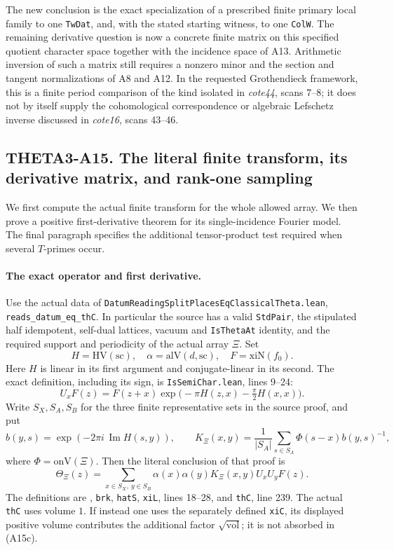 \documentclass[11pt]{article}
\theoremstyle{definition}\newtheorem{definition}[theorem]{Definition}\newtheorem{remark}[theorem]{Remark}
\begin{document}
The new conclusion is the exact specialization of a prescribed finite
primary local family to one \texttt{TwDat}, and, with the stated
starting witness, to one \texttt{ColW}.  The remaining derivative
question is now a concrete finite matrix on this specified quotient
character space together with the incidence space of A13.  Arithmetic
inversion of such a matrix still requires a nonzero minor and the
section and tangent normalizations of A8 and A12.  In the requested
Grothendieck framework, this is a finite period comparison of the
kind isolated in \emph{cote44}, scans 7--8; it does not by itself
supply the cohomological correspondence or algebraic Lefschetz
inverse discussed in \emph{cote16}, scans 43--46.


\subsection{THETA3-A15. The literal finite transform, its derivative matrix, and rank-one sampling}
\label{A15}

We first compute the actual finite transform for the whole allowed
array.  We then prove a positive first-derivative theorem for its
single-incidence Fourier model.  The final paragraph specifies the
additional tensor-product test required when several $T$-primes occur.

\paragraph{The exact operator and first derivative.}
Use the actual data of
\nolinkurl{DatumReadingSplitPlacesEqClassicalTheta.lean},
\texttt{reads\_datum\_eq\_thC}.  In particular the source has a valid
\texttt{StdPair}, the stipulated half idempotent, self-dual lattices,
vacuum and \texttt{IsThetaAt} identity, and the required support and
periodicity of the actual array $\Xi$.  Set
\[
 H=\mathrm{HV}(\mathrm{sc}),\quad
 \alpha=\mathrm{alV}(d,\mathrm{sc}),\quad
 F=\mathrm{xiN}(f_0).
\]
Here $H$ is linear in its first argument and conjugate-linear in its
second.  The exact definition, including its sign, is
\texttt{IsSemiChar.lean}, lines 9--24:
\[
 U_xF(z)=F(z+x)
       \exp\bigl(-\pi H(z,x)-\tfrac\pi2H(x,x)\bigr).
 \tag{A15a}
\]
Write $S_X,S_A,S_B$ for the three finite representative sets in the
source proof, and put
\[
 b(y,s)=\exp(-2\pi i\,\operatorname{Im}H(s,y)),
 \qquad
 K_\Xi(x,y)=\frac1{|S_A|}\sum_{s\in S_A}
          \Phi(s-x)b(y,s)^{-1},
 \tag{A15b}
\]
where $\Phi=\mathrm{onV}(\Xi)$.  Then the literal conclusion of that
proof is
\[
 \Theta_\Xi(z)=
  \sum_{x\in S_X,\ y\in S_B}
      \alpha(x)\alpha(y)K_\Xi(x,y)U_xU_yF(z).
 \tag{A15c}
\]
The definitions are
,
\texttt{brk}, \texttt{hatS}, \texttt{xiL}, lines 18--28,
and \texttt{thC}, line 239.  The actual \texttt{thC} uses volume
$1$.  If instead one uses the separately defined \texttt{xiC},
its displayed positive volume contributes the additional factor
$\sqrt{\mathrm{vol}}$; it is not absorbed in (A15c).
\end{document}
